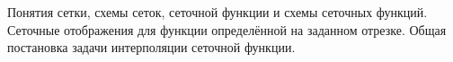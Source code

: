 \documentclass[__main__.tex]{subfiles}
\begin{document}
Понятия сетки, схемы сеток, сеточной функции и схемы сеточных функций. Сеточные отображения для функции определённой на заданном отрезке. Общая постановка задачи интерполяции сеточной функции.
\end{document}
